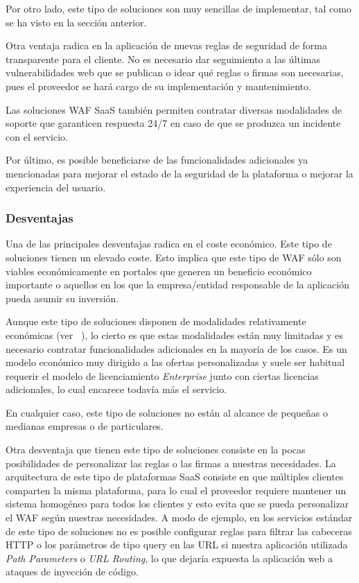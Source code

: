 \par Por otro lado, este tipo de soluciones son muy sencillas de implementar, tal como se ha visto en la sección anterior.
\par Otra ventaja radica en la aplicación de nuevas reglas de seguridad de forma transparente para el cliente. No es necesario dar seguimiento
a las últimas vulnerabilidades web que se publican o idear qué reglas o firmas son necesarias, pues el proveedor se hará cargo de su
implementación y mantenimiento.
\par Las soluciones WAF SaaS también permiten contratar diversas modalidades de soporte que garanticen respuesta 24/7 en caso de que se
produzca un incidente con el servicio.
\par Por último, es posible beneficiarse de las funcionalidades adicionales ya mencionadas para mejorar el estado de la seguridad de la plataforma o mejorar la experiencia del usuario.


\subsubsection{Desventajas}
\par Una de las principales desventajas radica en el coste económico. Este tipo de soluciones tienen un elevado coste. Esto implica que este tipo de WAF sólo son viables económicamente en portales que generen un beneficio económico importante o aquellos en los que la empresa/entidad responsable de la aplicación pueda asumir su inversión.
\par Aunque este tipo de soluciones disponen de modalidades relativamente económicas (ver ~), lo cierto es que estas modalidades
están muy limitadas y es necesario contratar funcionalidades adicionales en la mayoría de los casos. Es un modelo económico muy dirigido a las
ofertas personalizadas y suele ser habitual requerir el modelo de licenciamiento {\em Enterprise} junto con ciertas licencias adicionales, lo
cual encarece todavía más el servicio.
\par En cualquier caso, este tipo de soluciones no están al alcance de pequeñas o medianas empresas o de particulares.

\par Otra desventaja que tienen este tipo de soluciones consiste en la pocas posibilidades de personalizar las reglas o las firmas
a nuestras necesidades. La arquitectura de este tipo de plataformas SaaS consiste en que múltiples clientes comparten la misma plataforma, para
lo cual el proveedor requiere mantener un sistema homogéneo para todos los clientes y esto evita que se pueda personalizar el WAF según
nuestras necesidades. A modo de ejemplo, en los servicios estándar de este tipo de soluciones no es posible configurar reglas para filtrar las
cabeceras HTTP o los parámetros de tipo query en las URL si nuestra aplicación utilizada {\em Path Parameters} o {\em URL Routing}, lo que
dejaría expuesta la aplicación web a ataques de inyección de código.


